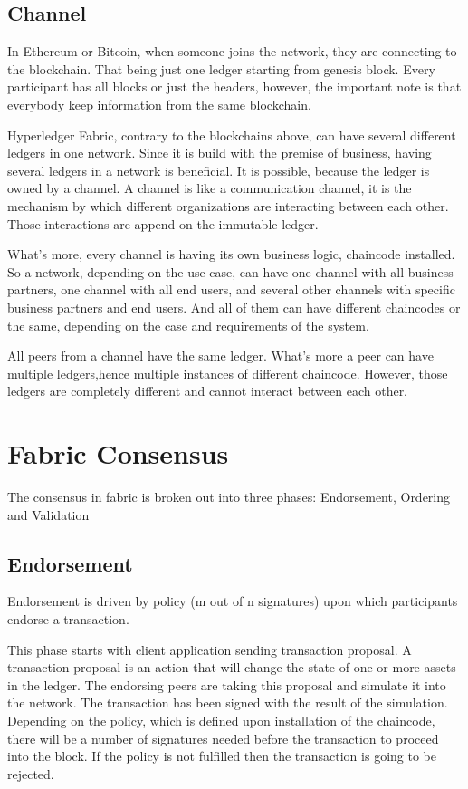 \documentclass[a4paper,11pt]{report}
\begin{document}
\subsection{Channel}
In Ethereum or Bitcoin, when someone joins the network, they are connecting to the blockchain. That being just one ledger starting from genesis block. Every participant has all blocks or just the headers, however, the important note is that everybody keep information from the same blockchain.

	Hyperledger Fabric, contrary to the blockchains above, can have several different ledgers in one network. Since it is build with the premise of business, having several ledgers in a network is beneficial. It is possible, because the ledger is owned by a channel. A channel is like a communication channel, it is the mechanism by which different organizations are interacting between each other. Those interactions are append on the immutable ledger. 
	
What’s more, every channel is having its own business logic, chaincode installed. So a network, depending on the use case, can have one channel with all business partners, one channel with all end users, and several other channels with specific business partners and end users. And all of them can have different chaincodes or the same, depending on the case and requirements of the system.

All peers from a channel have the same ledger. What’s more a peer can have multiple ledgers,hence multiple instances of different chaincode. However, those ledgers are completely different and cannot interact between each other.


\section{Fabric Consensus}
\label{fabricConsensus}
The consensus in fabric is broken out into three phases: Endorsement, Ordering and Validation

\subsection{Endorsement}
Endorsement is driven by policy (m out of n signatures) upon which participants endorse a transaction.

	This phase starts with client application sending transaction proposal. A transaction proposal is an action that will change the state of one or more assets in the ledger. The endorsing peers are taking this proposal and simulate it into the network. The transaction has been signed with the result of the simulation. Depending on the policy, which is defined upon installation of the chaincode, there will be a number of signatures needed before the transaction to proceed into the block. If the policy is not fulfilled then the transaction is going to be rejected.
	    
\end{document}
